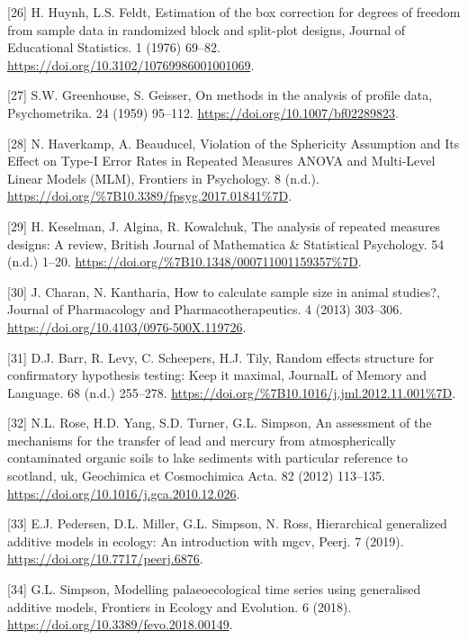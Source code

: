\documentclass[
]{article}
\begin{document}
\leavevmode\hypertarget{ref-huynh1976}{}%
{[}26{]} H. Huynh, L.S. Feldt, Estimation of the box correction for degrees of freedom from sample data in randomized block and split-plot designs, Journal of Educational Statistics. 1 (1976) 69--82. \url{https://doi.org/10.3102/10769986001001069}.

\leavevmode\hypertarget{ref-greenhouse1959}{}%
{[}27{]} S.W. Greenhouse, S. Geisser, On methods in the analysis of profile data, Psychometrika. 24 (1959) 95--112. \url{https://doi.org/10.1007/bf02289823}.

\leavevmode\hypertarget{ref-haverkamp2017}{}%
{[}28{]} N. Haverkamp, A. Beauducel, Violation of the Sphericity Assumption and Its Effect on Type-I Error Rates in Repeated Measures ANOVA and Multi-Level Linear Models (MLM), Frontiers in Psychology. 8 (n.d.). \url{https://doi.org/\%7B10.3389/fpsyg.2017.01841\%7D}.

\leavevmode\hypertarget{ref-keselman2001}{}%
{[}29{]} H. Keselman, J. Algina, R. Kowalchuk, The analysis of repeated measures designs: A review, British Journal of Mathematica \& Statistical Psychology. 54 (n.d.) 1--20. \url{https://doi.org/\%7B10.1348/000711001159357\%7D}.

\leavevmode\hypertarget{ref-charan2013}{}%
{[}30{]} J. Charan, N. Kantharia, How to calculate sample size in animal studies?, Journal of Pharmacology and Pharmacotherapeutics. 4 (2013) 303--306. \url{https://doi.org/10.4103/0976-500X.119726}.

\leavevmode\hypertarget{ref-barr2013}{}%
{[}31{]} D.J. Barr, R. Levy, C. Scheepers, H.J. Tily, Random effects structure for confirmatory hypothesis testing: Keep it maximal, JournalL of Memory and Language. 68 (n.d.) 255--278. \url{https://doi.org/\%7B10.1016/j.jml.2012.11.001\%7D}.

\leavevmode\hypertarget{ref-rose2012}{}%
{[}32{]} N.L. Rose, H.D. Yang, S.D. Turner, G.L. Simpson, An assessment of the mechanisms for the transfer of lead and mercury from atmospherically contaminated organic soils to lake sediments with particular reference to scotland, uk, Geochimica et Cosmochimica Acta. 82 (2012) 113--135. \url{https://doi.org/10.1016/j.gca.2010.12.026}.

\leavevmode\hypertarget{ref-pedersen2019}{}%
{[}33{]} E.J. Pedersen, D.L. Miller, G.L. Simpson, N. Ross, Hierarchical generalized additive models in ecology: An introduction with mgcv, Peerj. 7 (2019). \url{https://doi.org/10.7717/peerj.6876}.

\leavevmode\hypertarget{ref-simpson2018}{}%
{[}34{]} G.L. Simpson, Modelling palaeoecological time series using generalised additive models, Frontiers in Ecology and Evolution. 6 (2018). \url{https://doi.org/10.3389/fevo.2018.00149}.
\end{document}
